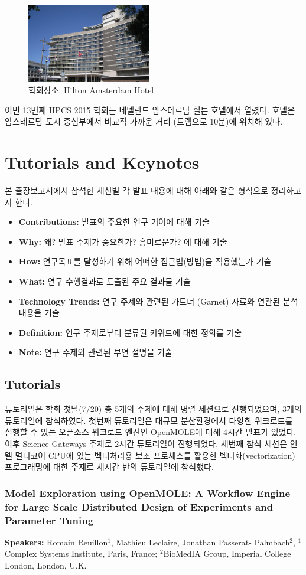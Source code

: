 \documentclass[twocolumn]{article}
\newcommand{\bi}{\begin{itemize}}
\newcommand{\ei}{\end{itemize}}
\newcommand{\ii}{\item}
\begin{document}
\begin{figure}[htb]
        \centering
        \includegraphics[width=0.48\textwidth]{hilton.png}
        \caption{학회장소: Hilton Amsterdam Hotel}
        \label{fig:hilton}
\end{figure}

이번 13번째 HPCS 2015 학회는 네델란드 암스테르담 힐튼 호텔에서 열렸다. 호텔은 암스테르담 도시 중심부에서 비교적 가까운 거리 (트램으로 10분)에 위치해 있다.

\section{Tutorials and Keynotes}
본 출장보고서에서 참석한 세션별 각 발표 내용에 대해 아래와 같은 형식으로 정리하고자 한다.
\bi
\ii \textbf{Contributions:} 발표의 주요한 연구 기여에 대해 기술
\ii \textbf{Why:} 왜? 발표 주제가 중요한가? 흥미로운가? 에 대해 기술
\ii \textbf{How:} 연구목표를 달성하기 위해 어떠한 접근법(방법)을 적용했는가 기술
\ii \textbf{What:} 연구 수행결과로 도출된 주요 결과물 기술
\ii \textbf{Technology Trends:} 연구 주제와 관련된 가트너 (Garnet) 자료와 연관된 분석내용을 기술
\ii \textbf{Definition:} 연구 주제로부터 분류된 키워드에 대한 정의를 기술
\ii \textbf{Note:} 연구 주제와 관련된 부연 설명을 기술
\ei

\subsection{Tutorials}
튜토리얼은 학회 첫날(7/20) 총 5개의 주제에 대해 병렬 세션으로 진행되었으며, 3개의 튜토리얼에 참석하였다.
첫번째 튜토리얼은 대규모 분산환경에서 다양한 워크로드를 실행할 수 있는 오픈소스 워크로드 엔진인 OpenMOLE에 대해 4시간 발표가 있었다.
이후 Science Gateways 주제로 2시간 튜토리얼이 진행되었다. 세번째 참석 세션은 인텔 멀티코어 CPU에 있는 벡터처리용 보조 프로세스를 활용한 벡터화(vectorization) 프로그래밍에 대한 주제로 세시간 반의 튜토리얼에 참석했다.

\subsubsection{Model Exploration using OpenMOLE: A Workflow Engine for Large Scale Distributed Design of Experiments and Parameter Tuning}
\textbf{Speakers:} Romain Reuillon$^1$, Mathieu Leclaire, Jonathan Passerat- Palmbach$^2$, $^1$Complex Systems Institute, Paris, France; $^2$BioMedIA Group, Imperial College London, London, U.K.
\end{document}
